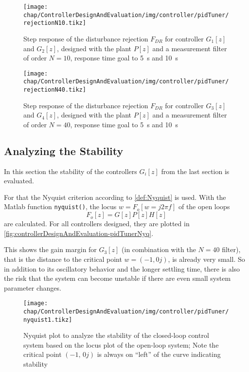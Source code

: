 \begin{figure}[tb]
	\centering
	\texttt{[image: chap/ControllerDesignAndEvaluation/img/controller/pidTuner/rejectionN10.tikz]}
	\caption{Step response of the disturbance rejection $F_{DR}$ for controller $G_1[z]$ and $G_2[z]$, designed with the plant $P[z]$ and a measurement filter of order $N=10$, response time goal to \SI{5}{\second} and \SI{10}{\second}}
	\label{fig:controllerDesignAndEvaluation-pidTunerDRN10}
\end{figure}

\begin{figure}[tb]
	\centering
	\texttt{[image: chap/ControllerDesignAndEvaluation/img/controller/pidTuner/rejectionN40.tikz]}
	\caption{Step response of the disturbance rejection $F_{DR}$ for controller $G_3[z]$ and $G_4[z]$, designed with the plant $P[z]$ and a measurement filter of order $N=40$, response time goal to \SI{5}{\second} and \SI{10}{\second}}
	\label{fig:controllerDesignAndEvaluation-pidTunerDRN40}
\end{figure}


\subsection{Analyzing the Stability}
In this section the stability of the controllers $G_{i}[z]$ from the last section is evaluated.

For that the Nyquist criterion according to \autoref{def:Nyquist} is used. With the Matlab function \texttt{nyquist()}, the locus $w=F_o[w=j2\pi f]$ of the open loops
\begin{equation}
F_o[z]=G[z] P[z] H[z]
\end{equation}
are calculated. For all controllers designed, they are plotted in \autoref{fig:controllerDesignAndEvaluation-pidTunerNyq}.

This shows the gain margin for $G_3[z]$ (in combination with the $N=40$ filter), that is the distance to the critical point $w=(-1,0j)$, is already very small. So in addition to its oscillatory behavior and the longer settling time, there is also the risk that the system can become unstable if there are even small system parameter changes.

\begin{figure}[tb]
	\centering
	\texttt{[image: chap/ControllerDesignAndEvaluation/img/controller/pidTuner/nyquist1.tikz]}
	\caption{Nyquist plot to analyze the stability of the closed-loop control system based on the locus plot of the open-loop system; Note the critical point $(-1,\,0j)$ is always on ``left'' of the curve indicating stability}
	\label{fig:controllerDesignAndEvaluation-pidTunerNyq}
\end{figure}

